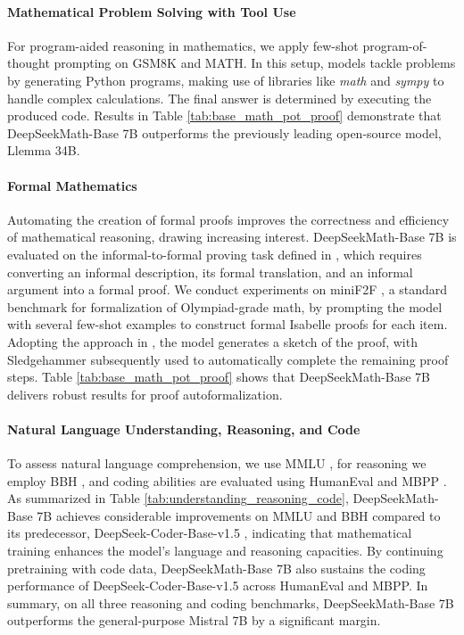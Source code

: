 \paragraph{Mathematical Problem Solving with Tool Use} For program-aided reasoning in mathematics, we apply few-shot program-of-thought prompting \citep{pot,pal} on GSM8K and MATH. In this setup, models tackle problems by generating Python programs, making use of libraries like \textit{math} and \textit{sympy} to handle complex calculations. The final answer is determined by executing the produced code. Results in Table \ref{tab:base_math_pot_proof} demonstrate that DeepSeekMath-Base 7B outperforms the previously leading open-source model, Llemma 34B.

\paragraph{Formal Mathematics}

Automating the creation of formal proofs improves the correctness and efficiency of mathematical reasoning, drawing increasing interest. DeepSeekMath-Base 7B is evaluated on the informal-to-formal proving task defined in \citep{dsp_proof}, which requires converting an informal description, its formal translation, and an informal argument into a formal proof. We conduct experiments on miniF2F \citep{minif2f}, a standard benchmark for formalization of Olympiad-grade math, by prompting the model with several few-shot examples to construct formal Isabelle proofs for each item. Adopting the approach in \cite{dsp_proof}, the model generates a sketch of the proof, with Sledgehammer \citep{sledgehammer} subsequently used to automatically complete the remaining proof steps. Table \ref{tab:base_math_pot_proof} shows that DeepSeekMath-Base 7B delivers robust results for proof autoformalization.

\paragraph{Natural Language Understanding, Reasoning, and Code}

To assess natural language comprehension, we use MMLU \citep{mmlu}, for reasoning we employ BBH \citep{bbh}, and coding abilities are evaluated using HumanEval \citep{codex} and MBPP \citep{mbpp}. As summarized in Table \ref{tab:understanding_reasoning_code}, DeepSeekMath-Base 7B achieves considerable improvements on MMLU and BBH compared to its predecessor, DeepSeek-Coder-Base-v1.5 \citep{deepseek-coder}, indicating that mathematical training enhances the model’s language and reasoning capacities. By continuing pretraining with code data, DeepSeekMath-Base 7B also sustains the coding performance of DeepSeek-Coder-Base-v1.5 across HumanEval and MBPP. In summary, on all three reasoning and coding benchmarks, DeepSeekMath-Base 7B outperforms the general-purpose Mistral 7B \citep{mistral} by a significant margin.

